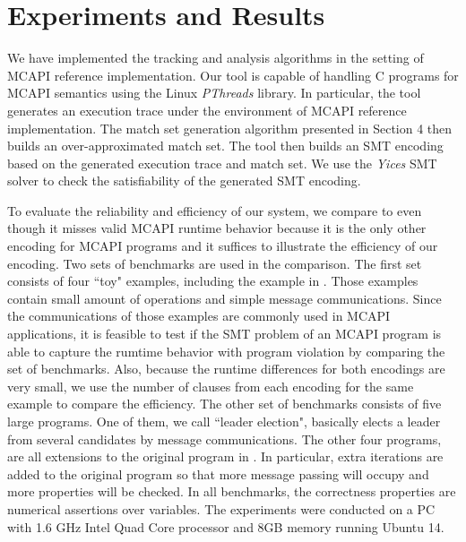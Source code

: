 \section{Experiments and Results}
We have implemented the tracking and analysis algorithms in the setting of MCAPI reference implementation. Our tool is capable of handling C programs for MCAPI semantics using the Linux \textit{PThreads} library. In particular, the tool generates an execution trace under the environment of MCAPI reference implementation. The match set generation algorithm presented in Section 4 then builds an over-approximated match set. The tool then builds an SMT encoding based on the generated execution trace and match set. We use the \textit{Yices} SMT solver \cite{dutertre:CAV06} to check the satisfiability of the generated SMT encoding.

To evaluate the reliability and efficiency of our system, we compare to \cite{elwakil:padtad10} even though it misses valid MCAPI runtime behavior because it is the only other encoding for MCAPI programs and it suffices to illustrate the efficiency of our encoding. Two sets of benchmarks are used in the comparison. The first set consists of four ``toy" examples, including the example in . Those examples contain small amount of operations and simple message communications. Since the communications of those examples are commonly used in MCAPI applications, it is feasible to test if the SMT problem of an MCAPI program is able to capture the rumtime behavior with program violation by comparing the set of benchmarks. Also, because the runtime differences for both encodings are very small, we use the number of clauses from each encoding for the same example to compare the efficiency. The other set of benchmarks consists of five large programs. One of them, we call ``leader election", basically elects a leader from several candidates by message communications. The other four programs, are all extensions to the original program in . In particular, extra iterations are added to the original program so that more message passing will occupy and more properties will be checked. In all benchmarks, the correctness
properties are numerical assertions over variables. The experiments were conducted on a PC with 1.6 GHz Intel Quad Core processor and 8GB memory running Ubuntu 14.

